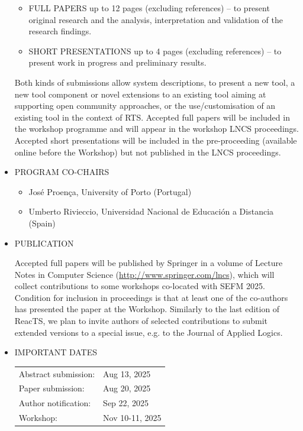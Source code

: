 \documentclass[prodmode,acmtecs]{acmsmall} %
\begin{document}
\begin{itemize}
\begin{itemize}\item  FULL PAPERS up to 12 pages (excluding references) – to present original research and the analysis, interpretation and validation of the research findings.
\item  SHORT PRESENTATIONS up to 4 pages (excluding references) – to present work in progress and preliminary results.
\end{itemize} 
  Both kinds of submissions allow system descriptions,  to present a new tool, a new tool component or novel extensions to an existing tool aiming at supporting open community approaches, or the use/customisation of an existing tool in the context of RTS. Accepted full papers will be included in the workshop programme and will appear in the workshop LNCS proceedings. Accepted short presentations will be included in the pre-proceeding (available online before the Workshop) but not published in the LNCS proceedings. 
 
\item  PROGRAM CO-CHAIRS 
 
\begin{itemize}\item  José Proença, University of Porto (Portugal)
\item  Umberto Rivieccio, Universidad Nacional de Educación a Distancia (Spain)
\end{itemize} 
\item  PUBLICATION 
 
  Accepted full papers will be published by Springer in a volume of Lecture Notes in Computer Science (\href{http://www.springer.com/lncs}{http://www.springer.com/lncs}), which will collect contributions to some workshops co-located with SEFM 2025. Condition for inclusion in proceedings is that at least one of the co-authors has presented the paper at the Workshop. Similarly to the last edition of ReacTS, we plan to invite authors of selected contributions to submit extended versions to a special issue, e.g. to the Journal of Applied Logics. 
 
\item  IMPORTANT DATES 
 
\begin{tabulary}{\linewidth}{LL}Abstract submission:  & Aug 13, 2025 \\
Paper submission:  & Aug 20, 2025 \\
Author notification:  & Sep 22, 2025 \\
Workshop:  & Nov 10-11, 2025 \\
\end{tabulary}
 

\end{itemize}
\end{document}
